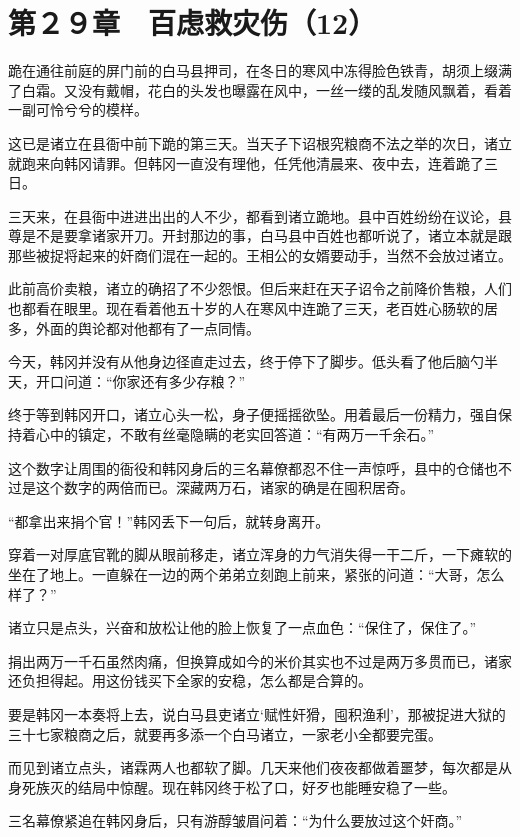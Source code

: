\section{第２９章　百虑救灾伤（12）}

跪在通往前庭的屏门前的白马县押司，在冬日的寒风中冻得脸色铁青，胡须上缀满了白霜。又没有戴帽，花白的头发也曝露在风中，一丝一缕的乱发随风飘着，看着一副可怜兮兮的模样。

这已是诸立在县衙中前下跪的第三天。当天子下诏根究粮商不法之举的次日，诸立就跑来向韩冈请罪。但韩冈一直没有理他，任凭他清晨来、夜中去，连着跪了三日。

三天来，在县衙中进进出出的人不少，都看到诸立跪地。县中百姓纷纷在议论，县尊是不是要拿诸家开刀。开封那边的事，白马县中百姓也都听说了，诸立本就是跟那些被捉将起来的奸商们混在一起的。王相公的女婿要动手，当然不会放过诸立。

此前高价卖粮，诸立的确招了不少怨恨。但后来赶在天子诏令之前降价售粮，人们也都看在眼里。现在看着他五十岁的人在寒风中连跪了三天，老百姓心肠软的居多，外面的舆论都对他都有了一点同情。

今天，韩冈并没有从他身边径直走过去，终于停下了脚步。低头看了他后脑勺半天，开口问道：“你家还有多少存粮？”

终于等到韩冈开口，诸立心头一松，身子便摇摇欲坠。用着最后一份精力，强自保持着心中的镇定，不敢有丝毫隐瞒的老实回答道：“有两万一千余石。”

这个数字让周围的衙役和韩冈身后的三名幕僚都忍不住一声惊呼，县中的仓储也不过是这个数字的两倍而已。深藏两万石，诸家的确是在囤积居奇。

“都拿出来捐个官！”韩冈丢下一句后，就转身离开。

穿着一对厚底官靴的脚从眼前移走，诸立浑身的力气消失得一干二斤，一下瘫软的坐在了地上。一直躲在一边的两个弟弟立刻跑上前来，紧张的问道：“大哥，怎么样了？”

诸立只是点头，兴奋和放松让他的脸上恢复了一点血色：“保住了，保住了。”

捐出两万一千石虽然肉痛，但换算成如今的米价其实也不过是两万多贯而已，诸家还负担得起。用这份钱买下全家的安稳，怎么都是合算的。

要是韩冈一本奏将上去，说白马县吏诸立‘赋性奸猾，囤积渔利’，那被捉进大狱的三十七家粮商之后，就要再多添一个白马诸立，一家老小全都要完蛋。

而见到诸立点头，诸霖两人也都软了脚。几天来他们夜夜都做着噩梦，每次都是从身死族灭的结局中惊醒。现在韩冈终于松了口，好歹也能睡安稳了一些。

三名幕僚紧追在韩冈身后，只有游醇皱眉问着：“为什么要放过这个奸商。”

